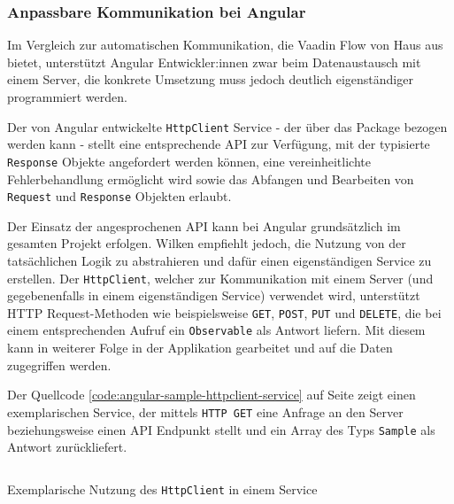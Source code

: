 \documentclass[a4paper,12pt,twoside]{scrreprt}
\begin{document}
\subsubsection{Anpassbare Kommunikation bei Angular}
\label{sub-sub-sec:kommunikation-herangehensweise-angular}
Im Vergleich zur automatischen Kommunikation, die Vaadin Flow von Haus aus bietet, unterstützt Angular Entwickler:innen zwar beim Datenaustausch mit einem Server, die konkrete Umsetzung muss jedoch deutlich eigenständiger programmiert werden.

\medskip

Der von Angular entwickelte \texttt{HttpClient} Service - der über das  Package bezogen werden kann - stellt eine entsprechende API zur Verfügung, mit der typisierte \texttt{Response} Objekte angefordert werden können, eine vereinheitlichte Fehlerbehandlung ermöglicht wird sowie das Abfangen und Bearbeiten von \texttt{Request} und \texttt{Response} Objekten erlaubt. \parencite[][]{google_llc_communicating_nodate}

\medskip

Der Einsatz der angesprochenen API kann bei Angular grundsätzlich im gesamten Projekt erfolgen. Wilken empfiehlt jedoch, die Nutzung von der tatsächlichen Logik zu abstrahieren und dafür einen eigenständigen Service zu erstellen. Der \texttt{HttpClient}, welcher zur Kommunikation mit einem Server (und gegebenenfalls in einem eigenständigen Service) verwendet wird, unterstützt HTTP Request-Methoden wie beispielsweise \texttt{GET}, \texttt{POST}, \texttt{PUT} und \texttt{DELETE}, die bei einem entsprechenden Aufruf ein \texttt{Observable} als Antwort liefern. Mit diesem kann in weiterer Folge in der Applikation gearbeitet und auf die Daten zugegriffen werden. \parencite[][Seite 142-144]{wilken_angular_2018}

\medskip

Der Quellcode \ref{code:angular-sample-httpclient-service} auf Seite \pageref{code:angular-sample-httpclient-service} zeigt einen exemplarischen Service, der mittels \texttt{HTTP GET} eine Anfrage an den Server beziehungsweise einen API Endpunkt stellt und ein Array des Typs \texttt{Sample} als Antwort zurückliefert.

\begin{listing}[ht]
    \renewcommand{\fcolorbox}[4][]{#4}
    \inputminted[fontsize=\footnotesize,linenos]{js}{code/Luidold_HttpClient-Service.ts}
    \caption[Exemplarische Nutzung des \texttt{HttpClient} in einem Service]{Exemplarische Nutzung des \texttt{HttpClient} in einem Service}
    \label{code:angular-sample-httpclient-service}
\end{listing}
\end{document}
